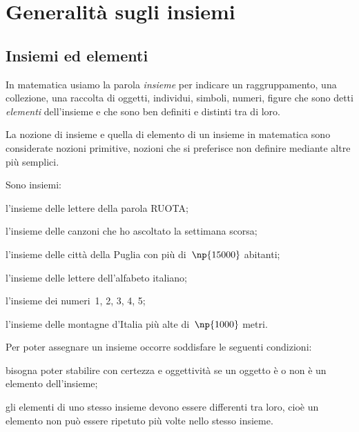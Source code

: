 \chapter{Generalità sugli insiemi}
\section{Insiemi ed elementi}

In matematica usiamo la parola \textit{insieme} per indicare un
raggruppamento, una collezione, una raccolta di oggetti, individui,
simboli, numeri, figure che sono detti \textit{elementi}
dell'insieme e che sono ben definiti e distinti tra di
loro.

La nozione di insieme e quella di elemento di un insieme in matematica
sono considerate nozioni primitive, nozioni che si preferisce non
definire mediante altre più semplici.

\begin{exrig}
 \begin{esempio}
 Sono insiemi:
 \begin{enumeratea}
  \item l'insieme delle lettere della parola RUOTA;
  \item l'insieme delle canzoni che ho ascoltato la settimana scorsa;
  \item l'insieme delle città della Puglia con più di~$\np{15000}$ abitanti;
  \item l'insieme delle lettere dell'alfabeto italiano;
  \item l'insieme dei numeri~1, 2, 3, 4, 5;
  \item l'insieme delle montagne d'Italia più alte di~$\np{1000}$ metri.
 \end{enumeratea}
 \end{esempio}
\end{exrig}

Per poter assegnare un insieme occorre soddisfare le seguenti condizioni:

\begin{itemize*}
\item bisogna poter stabilire con certezza e oggettività se un oggetto
è o non è un elemento dell'insieme;
\item gli elementi di uno stesso insieme devono essere differenti tra
loro, cioè un elemento non può essere ripetuto più volte nello stesso insieme.
\end{itemize*}


